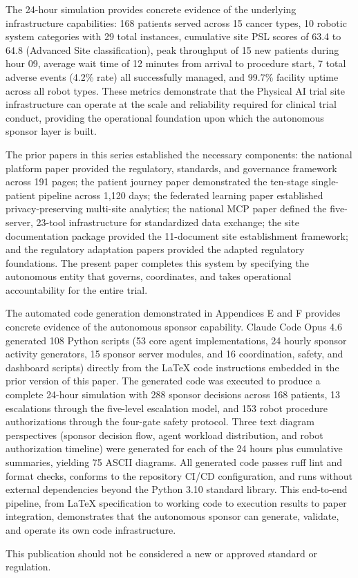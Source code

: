The 24-hour simulation \cite{main-repo} provides concrete evidence of the underlying
infrastructure capabilities: 168 patients served across 15 cancer types, 10 robotic
system categories with 29 total instances, cumulative site PSL scores of 63.4 to 64.8
(Advanced Site classification), peak throughput of 15 new patients during hour 09,
average wait time of 12 minutes from arrival to procedure start, 7 total adverse events
(4.2\% rate) all successfully managed, and 99.7\% facility uptime across all robot types.
These metrics demonstrate that the Physical AI trial site infrastructure can operate at
the scale and reliability required for clinical trial conduct, providing the operational
foundation upon which the autonomous sponsor layer is built.

The prior papers in this series established the necessary components: the national
platform paper \cite{national-platform-paper} provided the regulatory, standards, and
governance framework across 191 pages; the patient journey paper
\cite{patient-journey-paper} demonstrated the ten-stage single-patient pipeline across
1,120 days; the federated learning paper \cite{fl-paper} established privacy-preserving
multi-site analytics; the national MCP paper \cite{national-mcp-paper} defined the
five-server, 23-tool infrastructure for standardized data exchange; the site
documentation package \cite{site-docs} provided the 11-document site establishment
framework; and the regulatory adaptation papers \cite{ich-adapt, cfr50-adapt,
cfr312-adapt} provided the adapted regulatory foundations. The present paper completes
this system by specifying the autonomous entity that governs, coordinates, and takes
operational accountability for the entire trial.

The automated code generation demonstrated in Appendices E and F provides concrete
evidence of the autonomous sponsor capability. Claude Code Opus 4.6 generated 108
Python scripts (53 core agent implementations, 24 hourly sponsor activity generators,
15 sponsor server modules, and 16 coordination, safety, and dashboard scripts) directly
from the LaTeX code instructions embedded in the prior version of this paper. The
generated code was executed to produce a complete 24-hour simulation with 288 sponsor
decisions across 168 patients, 13 escalations through the five-level escalation model,
and 153 robot procedure authorizations through the four-gate safety protocol. Three
text diagram perspectives (sponsor decision flow, agent workload distribution, and
robot authorization timeline) were generated for each of the 24 hours plus cumulative
summaries, yielding 75 ASCII diagrams. All generated code passes ruff lint and format
checks, conforms to the repository CI/CD configuration, and runs without external
dependencies beyond the Python 3.10 standard library. This end-to-end pipeline, from
LaTeX specification to working code to execution results to paper integration,
demonstrates that the autonomous sponsor can generate, validate, and operate its own
code infrastructure.

This publication should not be considered a new or approved standard or regulation.
